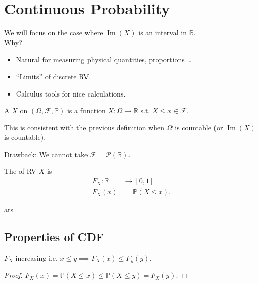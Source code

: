 \section{Continuous Probability}
We will focus on the case where $\operatorname{Im}(X)$ is an \underline{interval} in $\mathbb{R}$.\\
\underline{Why?}
\begin{itemize} \color{blue}
    \item Natural for measuring physical quantities, proportions \dots
    \item ``Limits'' of discrete RV.
    \item Calculus tools for nice calculations.
\end{itemize} 

\begin{definition}
    A  $X$ on $(\Omega, \mathcal{F}, \mathbb{P})$ is a function $X : \Omega \to \mathbb{R}$ s.t. ${X \leq x} \in \mathcal{F}$.
\end{definition} 
This is consistent with the previous definition when $\Omega$ is countable (or $\operatorname{Im}(X)$ is countable).

\underline{Drawback}: We cannot take $\mathcal{F} = \mathcal{P}(\mathbb{R})$.

\begin{definition}
    The  of RV $X$ is
    \begin{align*}
        F_X: \mathbb{R} &\to [0, 1] \\
        F_X(x) &= \mathbb{P}(X \leq x).
    \end{align*} 
\end{definition} 

\begin{example}
ars
\end{example} 

\subsection{Properties of CDF}

\begin{claim}
    $F_X$ increasing i.e. $x \leq y \implies F_X(x) \leq F_y(y)$.
\end{claim} 

\begin{proof}
    $F_X(x) = \mathbb{P}(X \leq x) \leq \mathbb{P}(X \leq y) = F_X(y)$.
\end{proof} 

